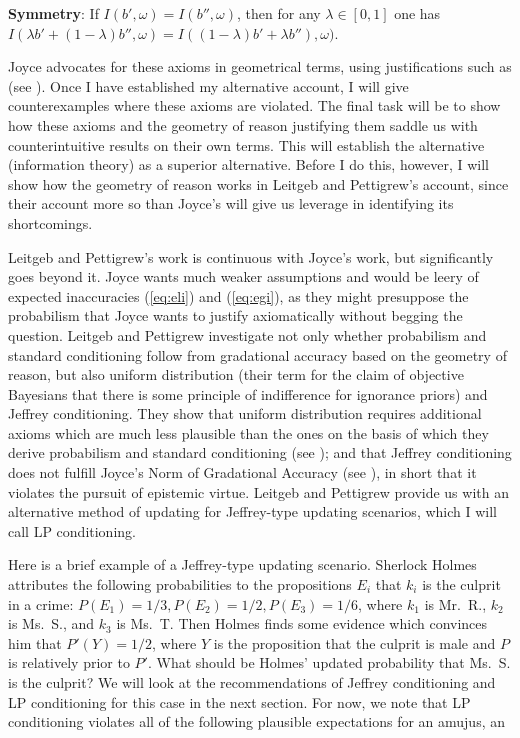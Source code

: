 \documentclass[11pt]{article}
\begin{document}
\begin{quotex}
  \textbf{Symmetry}: If $I(b',\omega)=I(b'',\omega)$, then for any
  $\lambda\in{}[0,1]$ one has\newline
  $I(\lambda{}b'+(1-\lambda)b'',\omega)=I((1-\lambda){}b'+\lambda{}b''),\omega)$.
\end{quotex}

Joyce advocates for these axioms in geometrical terms, using
justifications such as  (see ). Once I have established my
alternative account, I will give counterexamples where these axioms
are violated. The final task will be to show how these axioms and the
geometry of reason justifying them saddle us with counterintuitive
results on their own terms. This will establish the alternative
(information theory) as a superior alternative. Before I do this,
however, I will show how the geometry of reason works in Leitgeb and
Pettigrew's account, since their account more so than Joyce's will
give us leverage in identifying its shortcomings.

Leitgeb and Pettigrew's work is continuous with Joyce's work, but
significantly goes beyond it. Joyce wants much weaker assumptions and
would be leery of expected inaccuracies (\ref{eq:eli}) and
(\ref{eq:egi}), as they might presuppose the probabilism that Joyce
wants to justify axiomatically without begging the question. Leitgeb
and Pettigrew investigate not only whether probabilism and standard
conditioning follow from gradational accuracy based on the geometry of
reason, but also uniform distribution (their term for the claim of
objective Bayesians that there is some principle of indifference for
ignorance priors) and Jeffrey conditioning. They show that uniform
distribution requires additional axioms which are much less plausible
than the ones on the basis of which they derive probabilism and
standard conditioning (see ); and
that Jeffrey conditioning does not fulfill Joyce's Norm of Gradational
Accuracy (see ), in short that it violates the
pursuit of epistemic virtue. Leitgeb and Pettigrew provide us with an
alternative method of updating for Jeffrey-type updating scenarios,
which I will call LP conditioning.

Here is a brief example of a Jeffrey-type updating scenario. Sherlock
Holmes attributes the following probabilities to the propositions
$E_{i}$ that $k_{i}$ is the culprit in a crime:
$P(E_{1})=1/3,P(E_{2})=1/2,P(E_{3})=1/6$, where $k_{1}$ is Mr.\ R.,
$k_{2}$ is Ms.\ S., and $k_{3}$ is Ms.\ T. Then Holmes finds some
evidence which convinces him that $P'(Y)=1/2$, where $Y$ is the
proposition that the culprit is male and $P$ is relatively prior to
$P'$. What should be Holmes' updated probability that Ms.\ S. is the
culprit? We will look at the recommendations of Jeffrey conditioning
and LP conditioning for this case in the next section. For now, we
note that LP conditioning violates all of the following plausible
expectations for an amujus, an 
\end{document}
